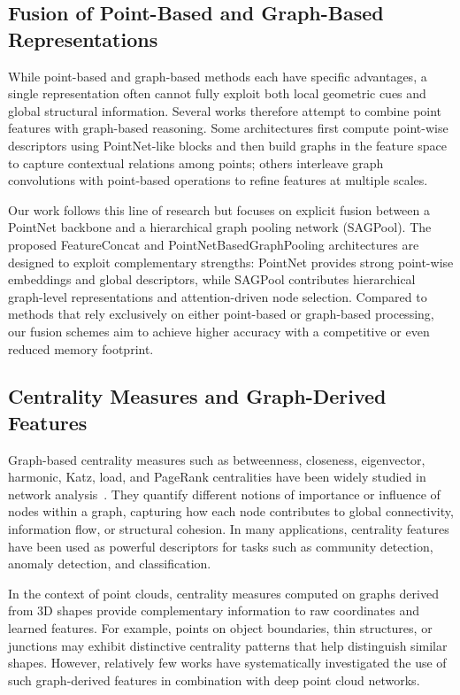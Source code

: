 \documentclass[conference]{IEEEtran}
\begin{document}
\subsection{Fusion of Point-Based and Graph-Based Representations}

While point-based and graph-based methods each have specific advantages, a
single representation often cannot fully exploit both local geometric cues and
global structural information. Several works therefore attempt to combine point
features with graph-based reasoning. Some architectures first compute
point-wise descriptors using PointNet-like blocks and then build graphs in the
feature space to capture contextual relations among points; others interleave
graph convolutions with point-based operations to refine features at multiple
scales.

Our work follows this line of research but focuses on explicit fusion between a
PointNet backbone and a hierarchical graph pooling network (SAGPool). The
proposed FeatureConcat and PointNetBasedGraphPooling architectures are designed
to exploit complementary strengths: PointNet provides strong point-wise
embeddings and global descriptors, while SAGPool contributes hierarchical
graph-level representations and attention-driven node selection. Compared to
methods that rely exclusively on either point-based or graph-based processing,
our fusion schemes aim to achieve higher accuracy with a competitive or even
reduced memory footprint.

\subsection{Centrality Measures and Graph-Derived Features}

Graph-based centrality measures such as betweenness, closeness, eigenvector,
harmonic, Katz, load, and PageRank centralities have been widely studied in
network analysis~\cite{b13,b14}. They quantify different notions of importance
or influence of nodes within a graph, capturing how each node contributes to
global connectivity, information flow, or structural cohesion. In many
applications, centrality features have been used as powerful descriptors for
tasks such as community detection, anomaly detection, and classification.

In the context of point clouds, centrality measures computed on graphs derived
from 3D shapes provide complementary information to raw coordinates and learned
features. For example, points on object boundaries, thin structures, or
junctions may exhibit distinctive centrality patterns that help distinguish
similar shapes. However, relatively few works have systematically investigated
the use of such graph-derived features in combination with deep point cloud
networks.
\end{document}
